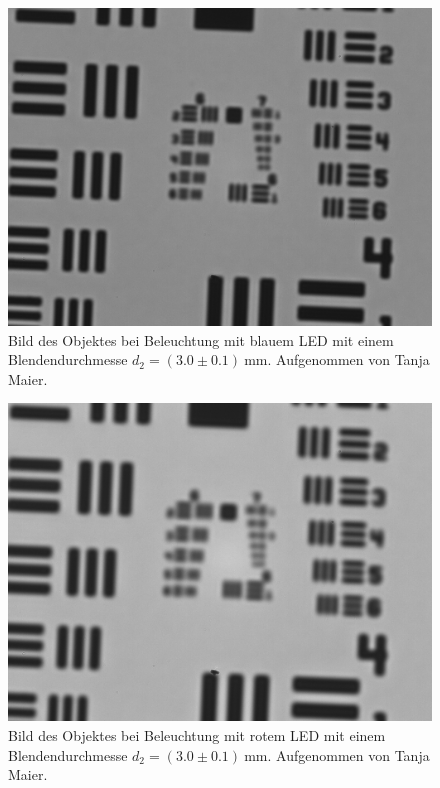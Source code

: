 \documentclass{article}
\begin{document}
\begin{minipage}[t]{.45\textwidth}
\begin{figure}[H]
\includegraphics[scale=0.1]{tm/Bild_blau_mittlere Lochblende.jpg}
\caption{Bild des Objektes bei Beleuchtung mit blauem LED mit einem Blendendurchmesse $d_2=(3.0\pm0.1)~$mm. Aufgenommen von Tanja Maier.}
\label{fig:bbild_klein_blau_tm}
\end{figure}
\end{minipage}
\hfill
\noindent
\begin{minipage}[t]{.45\textwidth}
\begin{figure}[H]
\includegraphics[scale=0.1]{tm/Bild_rot_mittlere Lochblende.jpg}
\caption{Bild des Objektes bei Beleuchtung mit rotem LED mit einem Blendendurchmesse $d_2=(3.0\pm0.1)~$mm. Aufgenommen von Tanja Maier.}
\end{figure}
\end{minipage}
\end{document}

